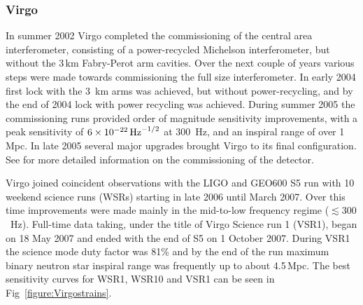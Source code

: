 \documentclass{article}
\begin{document}
\subsubsection{Virgo}
In summer 2002 Virgo completed the commissioning of the central area
interferometer, consisting of a power-recycled Michelson interferometer, but
without the 3\,km Fabry-Perot arm cavities. Over the next couple of years
various steps were made towards commissioning the full size interferometer. In
early 2004 first lock with the 3~km arms was achieved, but without
power-recycling, and by the end of 2004 lock with power recycling was achieved.
During summer 2005 the commissioning runs provided order of magnitude
sensitivity improvements, with a peak sensitivity of $6\times10^{-22}\,{\rm
Hz}^{-1/2}$ at 300~Hz, and an inspiral range of over 1\,Mpc. In late 2005
several major upgrades brought Virgo to its final configuration. See
\cite{Acernese:2004, Acernese:2005, Acernese:2006, Acernese:2007} for more
detailed information on the commissioning of the detector.

Virgo joined coincident observations with the LIGO and GEO600 S5 run with 10
weekend science runs (WSRs) starting in late 2006 until March 2007. Over this
time improvements were made mainly in the mid-to-low frequency regime ($\lesssim
300$~Hz). Full-time data taking, under the title of Virgo Science run 1 (VSR1),
began on 18 May 2007 and ended with the end of S5 on 1 October 2007. During VSR1
the science mode duty factor was 81\% and by the end of the run maximum binary
neutron star inspiral range was frequently up to about 4.5\,Mpc. The best
sensitivity curves for WSR1, WSR10 and VSR1 can be seen in
Fig~\ref{figure:Virgostrains}.

\end{document}
